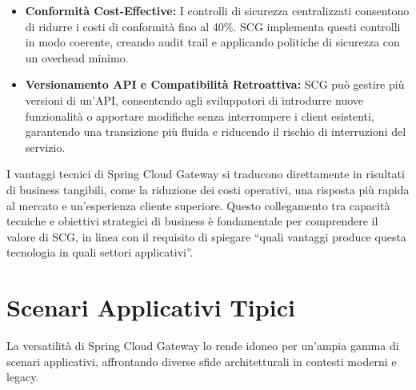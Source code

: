 \begin{itemize}
    \item \textbf{Conformità Cost-Effective:} I controlli di sicurezza centralizzati consentono di ridurre i costi di conformità fino al 40\%. SCG implementa questi controlli in modo coerente, creando audit trail e applicando politiche di sicurezza con un overhead minimo.
    \item \textbf{Versionamento API e Compatibilità Retroattiva:} SCG può gestire più versioni di un'API, consentendo agli sviluppatori di introdurre nuove funzionalità o apportare modifiche senza interrompere i client esistenti, garantendo una transizione più fluida e riducendo il rischio di interruzioni del servizio.
\end{itemize}

I vantaggi tecnici di Spring Cloud Gateway si traducono direttamente in risultati di business tangibili, come la riduzione dei costi operativi, una risposta più rapida al mercato e un'esperienza cliente superiore. Questo collegamento tra capacità tecniche e obiettivi strategici di business è fondamentale per comprendere il valore di SCG, in linea con il requisito di spiegare \enquote{quali vantaggi produce questa tecnologia in quali settori applicativi}.

\section{Scenari Applicativi Tipici}

La versatilità di Spring Cloud Gateway lo rende idoneo per un'ampia gamma di scenari applicativi, affrontando diverse sfide architetturali in contesti moderni e legacy.

